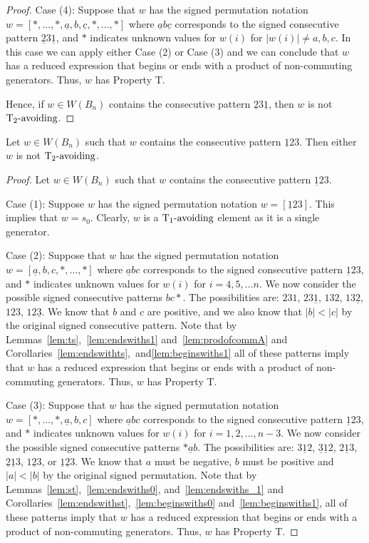 \begin{lemma}
\begin{proof}
	Case (4): Suppose that $w$ has the signed permutation notation $w=[\ast, \ldots,\ast, \underline{a},b,\underline{c}, \ast, \ldots, \ast]$ where $\underline{a}b\underline{c}$ corresponds to the signed consecutive pattern $\underline{2}3\underline{1}$, and $\ast$ indicates unknown values for $w(i)$ for $|w(i)|\neq a,b,c$. In this case we can apply either Case (2) or Case (3) and we can conclude that $w$ has a reduced expression that begins or ends with a product of non-commuting generators. Thus, $w$ has Property T.

	Hence, if $w \in W(B_n)$ contains the consecutive pattern $\underline{2}3\underline{1}$, then $w$ is not $\operatorname{T_2-\mathrm{avoiding}}$.
\end{proof}	
\end{lemma}

\begin{lemma}\label{lem:123}
Let $w \in W(B_n)$ such that $w$ contains the consecutive pattern $\underline{1}23$. Then either $w$ is not $\operatorname{T_2-\mathrm{avoiding}}$.
\begin{proof}
	Let $w \in W(B_n)$ such that $w$ contains the consecutive pattern $\underline{1}23$.
	
	Case (1): Suppose $w$ has the signed permutation notation $w=[\underline{1}23]$. This implies that $w=s_0$. Clearly, $w$ is a $\operatorname{T_1-\mathrm{avoiding}}$ element as it is a single generator.
	
	Case (2): Suppose that $w$ has the signed permutation notation $w=[\underline{a},b,c, \ast, \ldots, \ast]$ where $\underline{a}bc$ corresponds to the signed consecutive pattern $\underline{1}23$, and $\ast$ indicates unknown values for $w(i)$ for $i=4,5, \ldots n$. We now consider the possible signed consecutive patterns $bc \ast$. The possibilities are: $231$, $23 \underline{1}$, $132$, $13 \underline{2}$, $123$, $12 \underline{3}$. We know that $b$ and $c$ are positive, and we also know that $|b|<|c|$ by the original signed consecutive pattern. Note that by Lemmas~\ref{lem:ts},~\ref{lem:endswiths1} and~\ref{lem:prodofcommA} and Corollaries~\ref{lem:endswithts},~and\ref{lem:beginswiths1} all of these patterns imply that $w$ has a reduced expression that begins or ends with a product of non-commuting generators. Thus, $w$ has Property T.
	
	Case (3): Suppose that $w$ has the signed permutation notation $w=[\ast, \ldots, \ast, \underline{a},b,c]$ where $\underline{a}bc$ corresponds to the signed consecutive pattern $\underline{1}23$, and $\ast$ indicates unknown values for $w(i)$ for $i=1,2, \ldots ,n-3$. We now consider the possible signed consecutive patterns $\ast \underline{a} b$. The possibilities are: $3 \underline{1} 2$, $\underline{3} \underline{1} 2$, $2 \underline{1} 3$, $\underline{2} \underline{1} 3$, $1 \underline{2} 3$, or $\underline{1} \underline{2} 3$. We know that $a$ must be negative, $b$ must be positive and $|a|<|b|$ by the original signed permutation. Note that by Lemmas~\ref{lem:st},~\ref{lem:endswiths0}, and~\ref{lem:endswiths_1} and Corollaries~\ref{lem:endswithst},~\ref{lem:beginswiths0} and~\ref{lem:beginswiths1}, all of these patterns imply that $w$ has a reduced expression that begins or ends with a product of non-commuting generators. Thus, $w$ has Property T. 
	

\end{proof}
\end{lemma}
